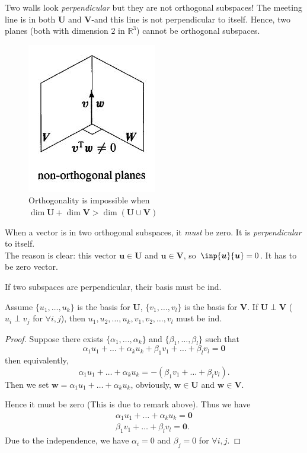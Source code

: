 \begin{example}
Two walls look \textit{perpendicular} but they are not orthogonal subspaces! The meeting line is in both $\bm U$ and $\bm V$-and this line is not perpendicular to itself. Hence, two planes (both with dimension $2$ in $\mathbb{R}^{3}$) cannot be orthogonal subspaces.

\begin{figure}[H]
\centering
\includegraphics{week5/orthogonality}
\caption{Orthogonality is impossible when $\dim\bm U+\dim\bm V>\dim(\bm U\cup\bm V)$}
\end{figure}
\end{example}
\begin{remark}
When a vector is in two orthogonal subspaces, it \textit{must} be zero. It is \emph{perpendicular} to
itself. 
\\The reason is clear: this vector $\bm u\in\bm U$ and $\bm u\in\bm V$, so $\inp{\bm u}{\bm u}=0$. It has to be zero vector.
\end{remark}
If two subspaces are perpendicular, their basis must be ind.
\begin{theorem}
Assume $\{u_1,\dots,u_k\}$ is the basis for $\bm U$, $\{v_1,\dots,v_l\}$ is the basis for $\bm V.$ If $\bm U\perp\bm V$ ($u_i\perp v_j$ for $\forall i,j$), then $u_1,u_2,\dots,u_k,v_1,v_2,\dots,v_l$ must be ind.
\end{theorem}
\begin{proof}
Suppose there exists $\{\alpha_1,\dots,\alpha_k\}$ and $\{\beta_1,\dots,\beta_l\}$ such that
\[
\alpha_1u_1+\dots+\alpha_ku_k+\beta_1v_1+\dots+\beta_lv_l=\bm 0
\]
then equivalently,
\[
\alpha_1u_1+\dots+\alpha_ku_k=-(\beta_1v_1+\dots+\beta_lv_l).
\]
Then we set $\bm w=\alpha_1u_1+\dots+\alpha_ku_k$, obviously, $\bm w\in\bm U$ and $\bm w\in\bm V$.

 Hence it must be zero (This is due to remark above). Thus we have
\begin{gather*}
\alpha_1u_1+\dots+\alpha_ku_k=\bm 0\\
\beta_1v_1+\dots+\beta_lv_l=\bm 0.
\end{gather*}
Due to the independence, we have $\alpha_i=0$ and $\beta_j=0$ for $\forall i,j$. 
\end{proof}
